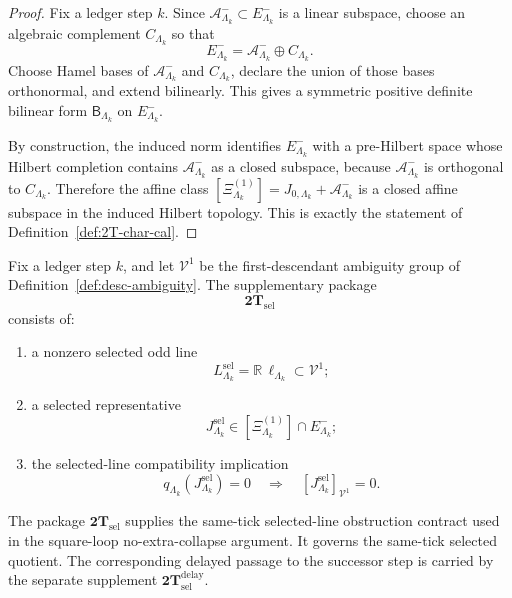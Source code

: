 \begin{proof}
Fix a ledger step \(k\). Since \(\mathcal A^-_{\Lambda_k}\subset E^-_{\Lambda_k}\) is a
linear subspace, choose an algebraic complement \(C_{\Lambda_k}\) so that
\[
E^-_{\Lambda_k}=\mathcal A^-_{\Lambda_k}\oplus C_{\Lambda_k}.
\]
Choose Hamel bases of \(\mathcal A^-_{\Lambda_k}\) and \(C_{\Lambda_k}\), declare the union
of those bases orthonormal, and extend bilinearly. This gives a symmetric positive
definite bilinear form \(\mathsf B_{\Lambda_k}\) on \(E^-_{\Lambda_k}\).

By construction, the induced norm identifies \(E^-_{\Lambda_k}\) with a pre-Hilbert
space whose Hilbert completion contains \(\mathcal A^-_{\Lambda_k}\) as a closed subspace,
because \(\mathcal A^-_{\Lambda_k}\) is orthogonal to \(C_{\Lambda_k}\).
Therefore the affine class
\(
[\Xi^{(1)}_{\Lambda_k}]=J_{0,\Lambda_k}+\mathcal A^-_{\Lambda_k}
\)
is a closed affine subspace in the induced Hilbert topology. This is exactly the
statement of Definition~\ref{def:2T-char-cal}.
\end{proof}

\begin{definition}
\label{def:2T-sel}
Fix a ledger step \(k\), and let \(\mathcal V^1\) be the first-descendant ambiguity group of
Definition~\ref{def:desc-ambiguity}. The supplementary package
\[
\mathbf{2T}_{\mathrm{sel}}
\]
consists of:
\begin{enumerate}[label=\textnormal{(\roman*)},leftmargin=*,itemsep=0.3em]
\item a nonzero selected odd line
  \[
  L^{\mathrm{sel}}_{\Lambda_k}
  =
  \mathbb R\,\ell_{\Lambda_k}
  \subset \mathcal V^1;
  \]
\item a selected representative
  \[
  J^{\mathrm{sel}}_{\Lambda_k}\in[\Xi^{(1)}_{\Lambda_k}]\cap E^-_{\Lambda_k};
  \]
\item the selected-line compatibility implication
  \begin{equation}
  q_{\Lambda_k}(J^{\mathrm{sel}}_{\Lambda_k})=0
  \quad\Longrightarrow\quad
  [J^{\mathrm{sel}}_{\Lambda_k}]_{\mathcal V^1}=0.
  \label{eq:selected-line-compatibility}
  \end{equation}
\end{enumerate}
\end{definition}

\begin{remark}
\label{rem:Main-sel-two-lanes}
The package \(\mathbf{2T}_{\mathrm{sel}}\) supplies the same-tick selected-line
obstruction contract used in the square-loop no-extra-collapse argument.
It governs the same-tick selected quotient.
The corresponding delayed passage to the successor step is carried by
the separate supplement \(\mathbf{2T}_{\mathrm{sel}}^{\mathrm{delay}}\).
\end{remark}

